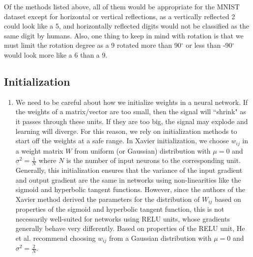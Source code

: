 \documentclass[a4paper]{article}
\begin{document}
\begin{enumerate}
{Of the methods listed above, all of them would be appropriate for the MNIST dataset except for horizontal or vertical reflections, as a vertically reflected 2 could look like a 5, and horizontally reflected digits would not be classified as the same digit by humans. Also, one thing to keep in mind with rotation is that we must limit the rotation degree as a 9 rotated more than 90$^{\circ}$ or less than -90$^{\circ}$ would look more like a 6 than a 9.

}
\end{enumerate}

\subsection{Initialization}
\begin{enumerate}
\item{ We need to be careful about how we initialize weights in a neural network. If the weights of a matrix/vector are too small, then the signal will ``shrink" as it passes through these units. If they are too big, the signal may explode and learning will diverge. For this reason, we rely on initialization methods to start off the weights at a safe range. 
\newline
\newline
In Xavier initialization, we choose $w_{ij}$ in a weight matrix $W$ from uniform (or Gaussian) distribution with $\mu=0$ and $\sigma^2 = \frac{1}{N}$ where $N$ is the number of input neurons to the corresponding unit. Generally, this initialization ensures that the variance of the input gradient and output gradient are the same in networks using non-linearities like the sigmoid and hyperbolic tangent functions.
\newline
\newline
However, since the authors of the Xavier method derived the parameters for the distribution of $W_{ij}$ based on properties of the sigmoid and hyperbolic tangent function, this is not necessarily well-suited for networks using RELU units, whose gradients generally behave very differently. Based on properties of the RELU unit, He et al. recommend choosing $w_{ij}$ from a Gaussian distribution with $\mu=0$ and $\sigma^2=\frac{2}{N}$. 

}
\end{enumerate}
\end{document}
